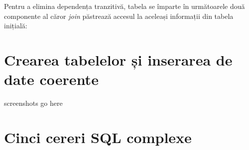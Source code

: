 \documentclass[a4paper, oneside, 12pt]{article}
\newcommand{\rowstyle}[1]{\gdef\currentrowstyle{#1}%
  #1\ignorespaces
}
\begin{document}
Pentru a elimina dependența tranzitivă, tabela se împarte în următoarele două
componente al căror \emph{join} păstrează accesul la aceleași informații din
tabela inițială:

\begin{table}[H]
\centering
\caption*{Tabela \textbf{SUBSCRIPTION\_1}:}
\end{table}

\begin{table}[H]
\centering
\caption*{Tabela \textbf{SUBSCRIPTION\_2}:}
\end{table}

\section{Crearea tabelelor și inserarea de date coerente}

screenshots go here

\section{Cinci cereri SQL complexe}

\begin{center}

\minipage{\linewidth}

\endminipage

\minipage{\linewidth}

\endminipage

\minipage{\linewidth}

\endminipage

\minipage{\linewidth}

\endminipage

\minipage{\linewidth}

\endminipage

\end{center}
\end{document}
